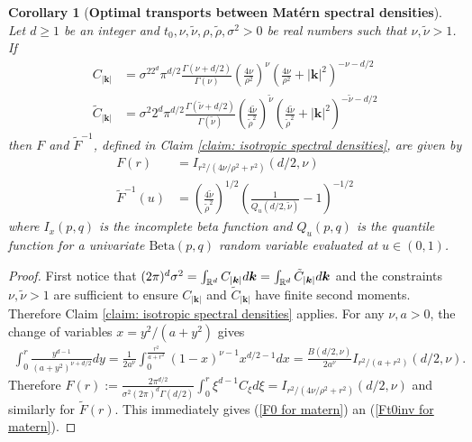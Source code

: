 \documentclass[10pt,noinfoline]{imsart}
\newtheorem{corollary}[theorem]{Corollary}
\newcommand{\bs}{\boldsymbol}
\begin{document}
\begin{corollary}[\textbf{Optimal transports between Mat\'ern spectral densities}]
\label{corollary: Optimal transports between Matern spectral densities}
Let $d\geq 1$ be an integer and $t_0,\nu,\tilde \nu, \rho, \tilde \rho,\sigma^2 > 0$ be real numbers such that $\nu,\tilde \nu >1$.
If 
\begin{align}
C_{|\bs k|} &= \sigma^22^{d}\pi^{d/2}\frac{\Gamma(\nu + d/2)}{\Gamma(\nu)}\left(\frac{4\nu}{\rho^2}\right)^{\nu}\left(\frac{4\nu}{\rho^2}+|\bs k|^2\right)^{-\nu-d/2} \label{eq: Ck matern}\\
\tilde C_{|\bs k|} &= \sigma^2 2^{d}\pi^{d/2}\frac{\Gamma(\tilde\nu + d/2)}{\Gamma(\tilde\nu)}\left(\frac{4\tilde\nu}{\tilde\rho^2}\right)^{\tilde\nu}\left(\frac{4\tilde\nu}{\tilde\rho^2}+|\bs k|^2\right)^{-\tilde\nu-d/2}\label{eq: tildeCk matern}
\end{align} 
 then $F$ and $\tilde F^{-1}$, defined in Claim \ref{claim: isotropic spectral densities}, are given by
\begin{align}
\label{F0 for matern}
F(r) &= I_{r^2/(4\nu / \rho^2 + r^2)}(d/2, \nu) \\
\tilde F^{-1}(u) &= \left(\frac{4\tilde\nu}{\tilde\rho^2}\right)^{1/2}\left(\frac{1}{Q_u(d/2,\tilde\nu)} -1 \right)^{-1/2} 
\label{Ft0inv for matern}
\end{align}
where $I_x(p,q)$ is the incomplete beta function and $Q_u(p,q)$ is the quantile function for a univariate $\text{Beta}(p,q)$ random variable evaluated at $u\in (0,1)$.
\end{corollary}
\begin{proof}
First notice that $ (2\pi)^d\sigma^2 =\int_{\Bbb R^d} C_{|\bs k|}d\bs k =  \int_{\Bbb R^d} \tilde C_{|\bs k|}d\bs k$ and the constraints $\nu, \tilde \nu>1$ are sufficient to ensure  $C_{|\bs k|}$ and $\tilde C_{|\bs k|}$ have finite second moments. Therefore Claim \ref{claim: isotropic spectral densities} applies. For any $\nu,a>0$, the change of variables $x= y^2/(a+y^2)$ gives
\begin{align*}
\int_0^r \frac{y^{d-1}}{(a+y^2)^{\nu+d/2}} dy = \frac{1}{2a^\nu}\int_0^{\frac{r^2}{a+r^2}} (1-x)^{\nu-1}x^{d/2-1}dx = \frac{B(d/2,\nu)}{2a^\nu}I_{r^2/(a + r^2)}(d/2,\nu).
\end{align*}
Therefore $F(r) := \frac{2\pi^{d/2}}{\sigma^2(2\pi)^d\Gamma(d/2)}\int_0^r \xi^{d-1}C_\xi d\xi = I_{r^2/(4\nu / \rho^2 + r^2)}(d/2,\nu) $
and similarly for $\tilde F(r)$. 
This immediately gives (\ref{F0 for matern}) an (\ref{Ft0inv for matern}).
\end{proof}
\end{document}
